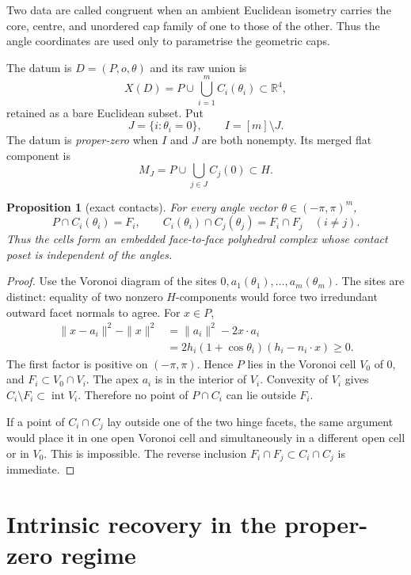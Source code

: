 \documentclass[11pt]{amsart}
\newtheorem{proposition}[theorem]{Proposition}
\theoremstyle{definition}
\newcommand{\R}{\mathbb{R}}
\begin{document}
Two data are called congruent when an ambient Euclidean isometry carries the
core, centre, and unordered cap family of one to those of the other.  Thus the
angle coordinates are used only to parametrise the geometric caps.

The datum is $D=(P,o,\theta)$ and its raw union is
\[
 X(D)=P\cup\bigcup_{i=1}^m C_i(\theta_i)\subset\R^4,
\]
retained as a bare Euclidean subset.  Put
\[
 J=\{i:\theta_i=0\},\qquad I=[m]\setminus J.
\]
The datum is \emph{proper-zero} when $I$ and $J$ are both nonempty.  Its
merged flat component is
\[
 M_J=P\cup\bigcup_{j\in J}C_j(0)\subset H.
\]

\begin{proposition}[exact contacts]
\label{prop:contacts}
For every angle vector $\theta\in(-\pi,\pi)^m$,
\[
 P\cap C_i(\theta_i)=F_i,
 \qquad
 C_i(\theta_i)\cap C_j(\theta_j)=F_i\cap F_j\quad(i\ne j).
\]
Thus the cells form an embedded face-to-face polyhedral complex whose contact
poset is independent of the angles.
\end{proposition}

\begin{proof}
Use the Voronoi diagram of the sites
$0,a_1(\theta_1),\ldots,a_m(\theta_m)$.  The sites are distinct: equality of
two nonzero $H$-components would force two irredundant outward facet normals
to agree.  For $x\in P$,
\begin{align*}
 \|x-a_i\|^2-\|x\|^2
 &=\|a_i\|^2-2x\cdot a_i\\
 &=2h_i(1+\cos\theta_i)(h_i-n_i\cdot x)\ge0.
\end{align*}
The first factor is positive on $(-\pi,\pi)$.  Hence $P$ lies in the Voronoi
cell $V_0$ of $0$, and $F_i\subset V_0\cap V_i$.  The apex $a_i$ is in the
interior of $V_i$.  Convexity of $V_i$ gives
$C_i\setminus F_i\subset\operatorname{int}V_i$.  Therefore no point of
$P\cap C_i$ can lie outside $F_i$.

If a point of $C_i\cap C_j$ lay outside one of the two hinge facets, the same
argument would place it in one open Voronoi cell and simultaneously in a
different open cell or in $V_0$.  This is impossible.  The reverse inclusion
$F_i\cap F_j\subset C_i\cap C_j$ is immediate.
\end{proof}

\section{Intrinsic recovery in the proper-zero regime}
\label{sec:intrinsic-recovery}
\end{document}
